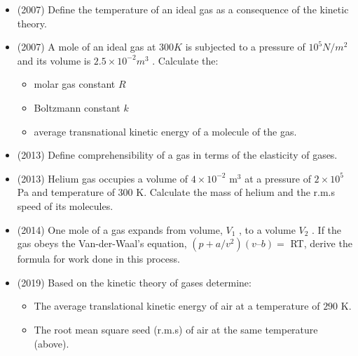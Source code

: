 \documentclass{article}
\begin{document}
\begin{itemize}
\item (2007)  Define the temperature of an ideal gas as a consequence of the kinetic theory.
\item (2007)  A mole of an ideal gas at $ 300K$ is subjected to a pressure of $ 10^{5}N/m^{2}$ and its volume is $ 2.5 \times 10^{-2}m^{3}$ .  Calculate the:
 \begin{itemize}
\item molar gas constant $ R$
\item Boltzmann constant $ k$
\item average transnational kinetic energy of a molecule of the gas.
\end{itemize}
\item (2013)  Define comprehensibility of a gas in terms of the elasticity of gases. 
\item (2013)  Helium gas occupies a volume of $ 4 \times 10^{-2}$ m$ ^{3}$ at a pressure of $ 2 \times 10^{5}$ Pa and temperature of $ 300$ K. Calculate the mass of helium and the r.m.s speed of its molecules.
\item (2014)  One mole of a gas expands from volume, $ V_{1}$ , to a volume $ V_{2}$ . If the gas obeys the Van-der-Waal’s equation, $ (p+ a/v^{2})(v – b)=$ RT, derive the formula for work done in this process.
\item (2019)  Based on the kinetic theory of gases determine:
 \begin{itemize}
\item The average translational kinetic energy of air at a temperature of $ 290$ K.
\item The root mean square seed (r.m.s) of air at the same temperature (above).
\end{itemize}
\end{itemize}
\end{document}
